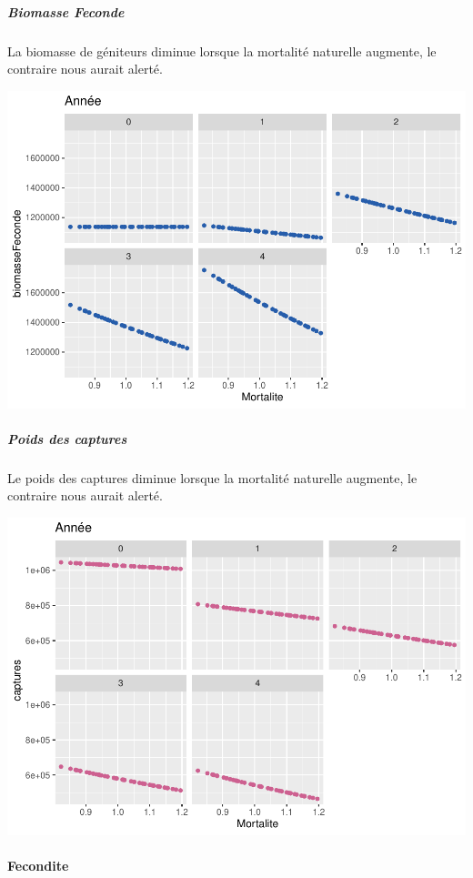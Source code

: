\documentclass[
]{article}
\begin{document}
\hypertarget{biomasse-feconde-3}{%
\subparagraph{Biomasse Feconde}\label{biomasse-feconde-3}}

La biomasse de géniteurs diminue lorsque la mortalité naturelle
augmente, le contraire nous aurait alerté.

\includegraphics{rapport_files/figure-latex/cm-1.pdf}

\hypertarget{poids-des-captures-3}{%
\subparagraph{Poids des captures}\label{poids-des-captures-3}}

Le poids des captures diminue lorsque la mortalité naturelle augmente,
le contraire nous aurait alerté.

\includegraphics{rapport_files/figure-latex/aj-1.pdf}

\hypertarget{fecondite}{%
\paragraph{Fecondite}\label{fecondite}}
\end{document}
